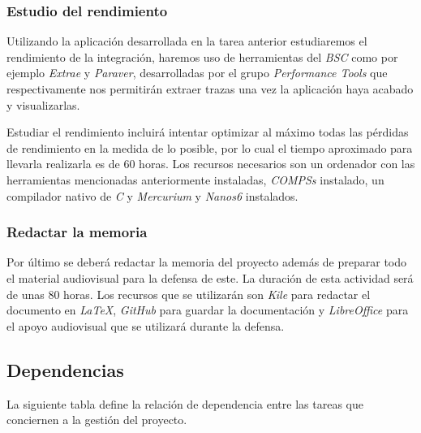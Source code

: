 \subsubsection{Estudio del rendimiento}

Utilizando la aplicación desarrollada en la tarea anterior estudiaremos el rendimiento de la integración, haremos uso de herramientas del \textit{BSC} como por ejemplo \textit{Extrae} y \textit{Paraver}, desarrolladas por el grupo \textit{Performance Tools} que respectivamente nos permitirán extraer trazas una vez la aplicación haya acabado y visualizarlas. 
\par\bigskip

Estudiar el rendimiento incluirá intentar optimizar al máximo todas las pérdidas de rendimiento en la medida de lo posible, por lo cual el tiempo aproximado para llevarla realizarla es de 60 horas. Los recursos necesarios son un ordenador con las herramientas mencionadas anteriormente instaladas, \textit{COMPSs} instalado, un compilador nativo de \textit{C} y \textit{Mercurium} y \textit{Nanos6} instalados.

\subsubsection{Redactar la memoria}

Por último se deberá redactar la memoria del proyecto además de preparar todo el material audiovisual para la defensa de este. La duración de esta actividad será de unas 80 horas. Los recursos que se utilizarán son \textit{Kile} para redactar el documento en \textit{LaTeX}, \textit{GitHub} para guardar la documentación y \textit{LibreOffice} para el apoyo audiovisual que se utilizará durante la defensa.

\subsection{Dependencias}

La siguiente tabla define la relación de dependencia entre las tareas que conciernen a la gestión del proyecto.

